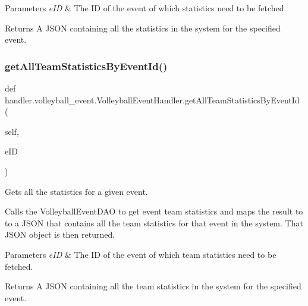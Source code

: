 \begin{DoxyParams}{Parameters}
{\em e\+ID} & The ID of the event of which statistics need to be fetched\\
\hline
\end{DoxyParams}
\begin{DoxyReturn}{Returns}
A J\+S\+ON containing all the statistics in the system for the specified event. 
\end{DoxyReturn}
\mbox{\label{classhandler_1_1volleyball__event_1_1_volleyball_event_handler_a21c5039e1c25a12fe96c06582a511688}} 
\subsubsection{\texorpdfstring{get\+All\+Team\+Statistics\+By\+Event\+Id()}{getAllTeamStatisticsByEventId()}}
{\footnotesize\ttfamily def handler.\+volleyball\+\_\+event.\+Volleyball\+Event\+Handler.\+get\+All\+Team\+Statistics\+By\+Event\+Id (\begin{DoxyParamCaption}\item[{}]{self,  }\item[{}]{e\+ID }\end{DoxyParamCaption})}



Gets all the statistics for a given event. 

Calls the Volleyball\+Event\+D\+AO to get event team statistics and maps the result to to a J\+S\+ON that contains all the team statistics for that event in the system. That J\+S\+ON object is then returned.


\begin{DoxyParams}{Parameters}
{\em e\+ID} & The ID of the event of which team statistics need to be fetched.\\
\hline
\end{DoxyParams}
\begin{DoxyReturn}{Returns}
A J\+S\+ON containing all the team statistics in the system for the specified event. 
\end{DoxyReturn}
\mbox{\label{classhandler_1_1volleyball__event_1_1_volleyball_event_handler_ad4060f95466b8c84dbcaf4e63507b9ea}} 
